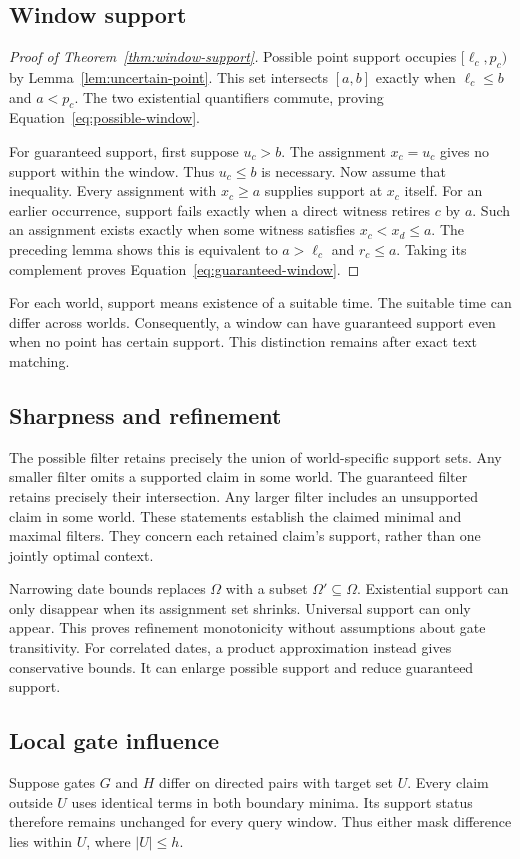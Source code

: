 \subsection{Window support}
\begin{proof}[Proof of Theorem~\ref{thm:window-support}]
Possible point support occupies $[\ell_c,p_c)$ by Lemma~\ref{lem:uncertain-point}.
This set intersects $[a,b]$ exactly when $\ell_c\leq b$ and $a<p_c$.
The two existential quantifiers commute, proving Equation~\ref{eq:possible-window}.

For guaranteed support, first suppose $u_c>b$.
The assignment $x_c=u_c$ gives no support within the window.
Thus $u_c\leq b$ is necessary.
Now assume that inequality.
Every assignment with $x_c\geq a$ supplies support at $x_c$ itself.
For an earlier occurrence, support fails exactly when a direct witness retires $c$ by $a$.
Such an assignment exists exactly when some witness satisfies $x_c<x_d\leq a$.
The preceding lemma shows this is equivalent to $a>\ell_c$ and $r_c\leq a$.
Taking its complement proves Equation~\ref{eq:guaranteed-window}.
\end{proof}

For each world, support means existence of a suitable time.
The suitable time can differ across worlds.
Consequently, a window can have guaranteed support even when no point has certain support.
This distinction remains after exact text matching.

\subsection{Sharpness and refinement}
The possible filter retains precisely the union of world-specific support sets.
Any smaller filter omits a supported claim in some world.
The guaranteed filter retains precisely their intersection.
Any larger filter includes an unsupported claim in some world.
These statements establish the claimed minimal and maximal filters.
They concern each retained claim's support, rather than one jointly optimal context.

Narrowing date bounds replaces $\Omega$ with a subset $\Omega'\subseteq\Omega$.
Existential support can only disappear when its assignment set shrinks.
Universal support can only appear.
This proves refinement monotonicity without assumptions about gate transitivity.
For correlated dates, a product approximation instead gives conservative bounds.
It can enlarge possible support and reduce guaranteed support.

\subsection{Local gate influence}
Suppose gates $G$ and $H$ differ on directed pairs with target set $U$.
Every claim outside $U$ uses identical terms in both boundary minima.
Its support status therefore remains unchanged for every query window.
Thus either mask difference lies within $U$, where $|U|\leq h$.

